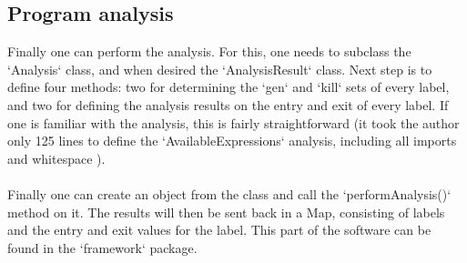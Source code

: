 \documentclass[paper=a4, fontsize=11pt]{scrartcl} %
\numberwithin{equation}{section} %
\numberwithin{figure}{section} %
\numberwithin{table}{section} %
\begin{document}
\subsection{Program analysis}

Finally one can perform the analysis.
For this, one needs to subclass the `Analysis` class, and when desired the `AnalysisResult` class.
Next step is to define four methods: two for determining the `gen` and `kill` sets of every label, and two for defining the analysis results on the entry and exit of every label.
If one is familiar with the analysis, this is fairly straightforward (it took the author only 125 lines to define the `AvailableExpressions` analysis, including all imports and whitespace \cite{ar}).
\\
\\
Finally one can create an object from the class and call the `performAnalysis()` method on it.
The results will then be sent back in a Map, consisting of labels and the entry and exit values for the label.
This part of the software can be found in the `framework` package.



\end{document}
